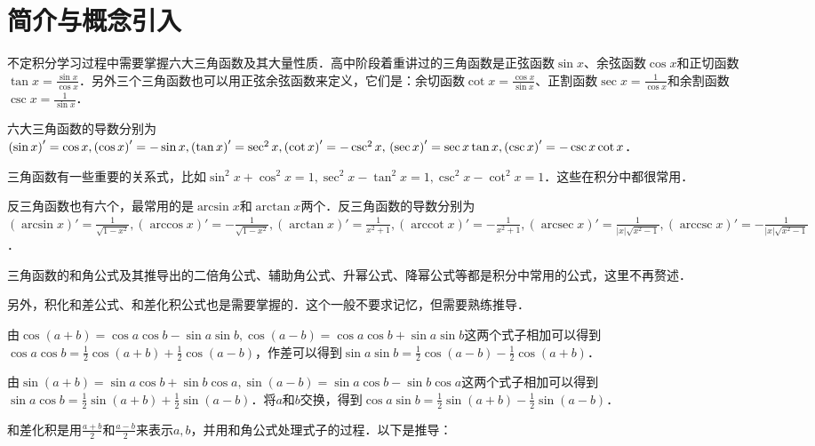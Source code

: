 \documentclass{ctexbook}
\DeclareMathOperator{\arccot}{arccot}
\DeclareMathOperator{\arcsec}{arcsec}
\DeclareMathOperator{\arccsc}{arccsc}
\begin{document}
\section{简介与概念引入}
不定积分学习过程中需要掌握六大三角函数及其大量性质．高中阶段着重讲过的三角函数是正弦函数$\sin{x}$、余弦函数$\cos{x}$和正切函数$\tan{x}=\frac{\sin{x}}{\cos{x}}$．另外三个三角函数也可以用正弦余弦函数来定义，它们是：余切函数$\cot{x}=\frac{\cos{x}}{\sin{x}}$、正割函数$\sec{x}=\frac{1}{\cos{x}}$和余割函数$\csc{x}=\frac{1}{\sin{x}}$．\par
六大三角函数的导数分别为$\left(\sin{x}\right)'=\cos{x},\left(\cos{x}\right)'=-\sin{x},\left(\tan{x}\right)'=\sec^{2}{x},\left(\cot{x}\right)'=-\csc^{2}{x},\\\left(\sec{x}\right)'=\sec{x}\tan{x},\left(\csc{x}\right)'=-\csc{x}\cot{x}$．\par
三角函数有一些重要的关系式，比如$\sin^{2}{x}+\cos^{2}{x}=1,\sec^{2}{x}-\tan^{2}{x}=1,\csc^{2}{x}-\cot^{2}{x}=1$．这些在积分中都很常用．\par
反三角函数也有六个，最常用的是$\arcsin{x}$和$\arctan{x}$两个．反三角函数的导数分别为$\left(\arcsin{x}\right)'=\frac{1}{\sqrt{1-x^{2}}},\left(\arccos{x}\right)'=-\frac{1}{\sqrt{1-x^{2}}},\left(\arctan{x}\right)'=\frac{1}{x^{2}+1},\left(\arccot{x}\right)'=-\frac{1}{x^{2}+1},\left(\arcsec{x}\right)'=\frac{1}{|x|\sqrt{x^{2}-1}},\left(\arccsc{x}\right)'=-\frac{1}{|x|\sqrt{x^{2}-1}}$．\par
三角函数的和角公式及其推导出的二倍角公式、辅助角公式、升幂公式、降幂公式等都是积分中常用的公式，这里不再赘述．\par
另外，积化和差公式、和差化积公式也是需要掌握的．这个一般不要求记忆，但需要熟练推导．\par
由$\cos{\left(a+b\right)}=\cos{a}\cos{b}-\sin{a}\sin{b},\cos{\left(a-b\right)}=\cos{a}\cos{b}+\sin{a}\sin{b}$这两个式子相加可以得到$\cos{a}\cos{b}=\frac{1}{2}\cos{\left(a+b\right)}+\frac{1}{2}\cos{\left(a-b\right)}$，作差可以得到$\sin{a}\sin{b}=\frac{1}{2}\cos{\left(a-b\right)}-\frac{1}{2}\cos{\left(a+b\right)}$．\par
由$\sin{\left(a+b\right)}=\sin{a}\cos{b}+\sin{b}\cos{a},\sin{\left(a-b\right)}=\sin{a}\cos{b}-\sin{b}\cos{a}$这两个式子相加可以得到$\sin{a}\cos{b}=\frac{1}{2}\sin{\left(a+b\right)}+\frac{1}{2}\sin{\left(a-b\right)}$．将$a$和$b$交换，得到$\cos{a}\sin{b}=\frac{1}{2}\sin{\left(a+b\right)}-\frac{1}{2}\sin{\left(a-b\right)}$．\par
和差化积是用$\frac{a+b}{2}$和$\frac{a-b}{2}$来表示$a,b$，并用和角公式处理式子的过程．以下是推导：\\
\end{document}
